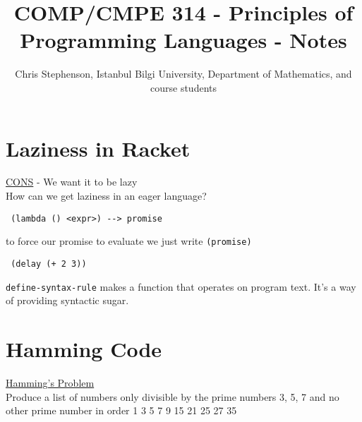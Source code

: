 \documentclass{article}
\begin{document}
\title{COMP/CMPE 314 - Principles of Programming Languages - Notes}
\author{Chris Stephenson, Istanbul Bilgi University, Department of Mathematics, and course students}
\maketitle

\section*{Laziness in Racket}
\begin{flushleft}
\underline{CONS} - We want it to be lazy\\
How can we get laziness in an eager language?\\
\begin{verbatim}
 (lambda () <expr>) --> promise
\end{verbatim}
to force our promise to evaluate we just write \verb|(promise)|\\
\begin{verbatim}
 (delay (+ 2 3))
\end{verbatim}
\verb|define-syntax-rule| makes a function that operates on program text. It's a way of providing syntactic sugar. 
\end{flushleft}

\section*{Hamming Code}
\begin{flushleft}
 \underline{Hamming's Problem}\\
 Produce a list of numbers only divisible by the prime numbers 3, 5, 7 and no other prime number in order 1 3 5 7 9 15 21 25 27 35
\end{flushleft}
\end{document}
